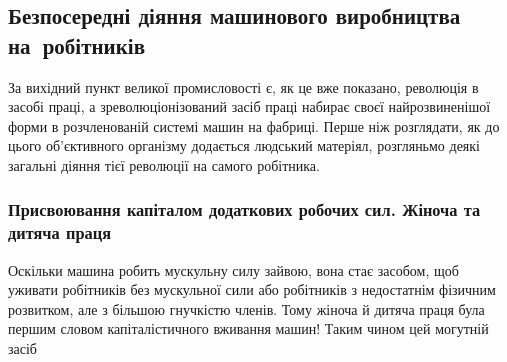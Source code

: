 \subsection{Безпосередні діяння машинового виробництва на~робітників}

За вихідний пункт великої промисловості є, як це вже
показано, революція в засобі праці, а зреволюціонізований засіб
праці набирає своєї найрозвиненішої форми в розчленованій
системі машин на фабриці. Перше ніж розглядати, як до цього
об’єктивного організму додається людський матеріял, розгляньмо
деякі загальні діяння тієї революції на самого робітника.

\subsubsection{Присвоювання капіталом додаткових робочих
сил. Жіноча та дитяча праця}

Оскільки машина робить мускульну силу зайвою, вона стає
засобом, щоб уживати робітників без мускульної сили або робітників
з недостатнім фізичним розвитком, але з більшою гнучкістю
членів. Тому жіноча й дитяча праця була першим словом капіталістичного
вживання машин! Таким чином цей могутній засіб
\parbreak{}  %
